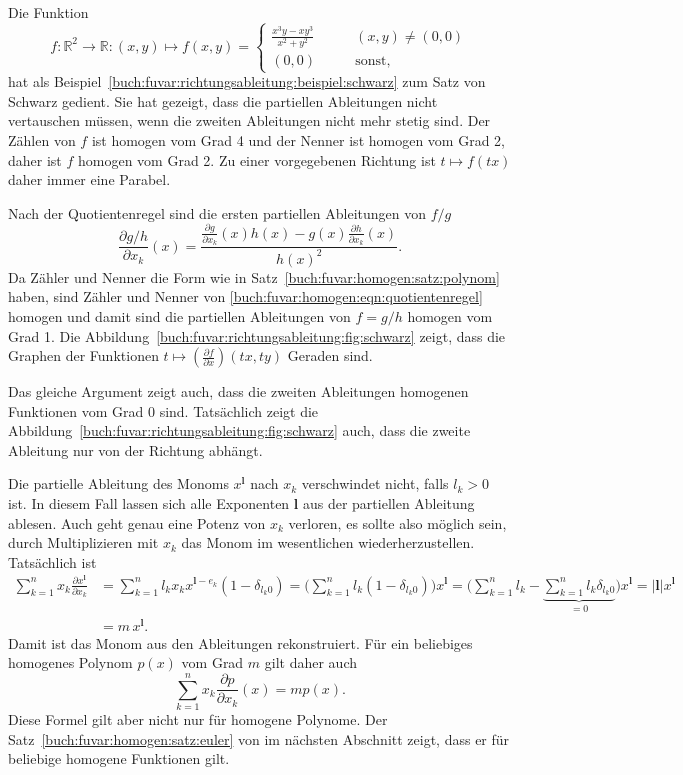 \begin{beispiel}
Die Funktion
\[
f
\colon
\mathbb{R}^2\to\mathbb{R}
:
(x,y)
\mapsto
f(x,y)
=
\begin{cases}
\displaystyle \frac{x^3y-xy^3}{x^2+y^2}&\qquad (x,y)\ne (0,0)\\
(0,0)&\qquad\text{sonst},
\end{cases}
\]
hat als Beispiel~\ref{buch:fuvar:richtungsableitung:beispiel:schwarz}
zum Satz von Schwarz gedient.
Sie hat gezeigt, dass die partiellen Ableitungen nicht vertauschen müssen,
wenn die zweiten Ableitungen nicht mehr stetig sind.
Der Zählen von $f$ ist homogen vom Grad 4 und der Nenner ist homogen vom
Grad 2, daher ist $f$ homogen vom Grad 2.
Zu einer vorgegebenen Richtung ist $t\mapsto f(tx)$ daher immer eine
Parabel.

Nach der Quotientenregel sind die ersten partiellen Ableitungen von $f/g$
\begin{equation}
\frac{\partial g/h}{\partial x_k}(x)
=
\frac{\displaystyle
\frac{\partial g}{\partial x_k}(x)h(x)-g(x)\frac{\partial h}{\partial x_k}(x)
}{h(x)^2}.
\label{buch:fuvar:homogen:eqn:quotientenregel}
\end{equation}
Da Zähler und Nenner die Form wie in Satz~\ref{buch:fuvar:homogen:satz:polynom}
haben, sind Zähler und Nenner von
\eqref{buch:fuvar:homogen:eqn:quotientenregel}
homogen und damit sind die partiellen Ableitungen von $f=g/h$ homogen
vom Grad 1.
Die Abbildung~\ref{buch:fuvar:richtungsableitung:fig:schwarz} zeigt,
dass die Graphen der Funktionen
$t\mapsto (\frac{\partial f}{\partial x})(tx,ty)$
Geraden sind.

Das gleiche Argument zeigt auch, dass die zweiten Ableitungen 
homogenen Funktionen vom Grad $0$ sind.
Tatsächlich zeigt 
die Abbildung~\ref{buch:fuvar:richtungsableitung:fig:schwarz} auch,
dass die zweite Ableitung nur von der Richtung abhängt.
\end{beispiel}

Die partielle Ableitung des Monoms $x^{\mathbf{l}}$ nach $x_k$
verschwindet nicht, falls $l_k>0$ ist.
In diesem Fall lassen sich alle Exponenten $\mathbf{l}$ aus der
partiellen Ableitung ablesen.
Auch geht genau eine Potenz von $x_k$ verloren, es sollte also
möglich sein, durch Multiplizieren mit $x_k$ das Monom im wesentlichen
wiederherzustellen.
Tatsächlich ist
\begin{align*}
\sum_{k=1}^n
x_k
\frac{\partial x^{\mathbf{l}}}{\partial x_k}
&=
\sum_{k=1}^n
l_k
x_k
x^{\mathbf{l}-e_k}
(1-\delta_{l_k0})
=
\biggl(
\sum_{k=1}^n
l_k
(1-\delta_{l_k0})
\biggr)
x^{\mathbf{l}}
=
\biggl(
\sum_{k=1}^n
l_k
-\underbrace{\sum_{k=1}^n
l_k\delta_{l_k0}}_{\displaystyle=0}
\biggr)
x^{\mathbf{l}}
=
|\mathbf{l}|
x^{\mathbf{l}}
\\
&=
m\,
x^{\mathbf{l}}.
\end{align*}
Damit ist das Monom aus den Ableitungen rekonstruiert.
Für ein beliebiges homogenes Polynom $p(x)$ vom Grad $m$ gilt daher auch
\[
\sum_{k=1}^n
x_k
\frac{\partial p}{\partial x_k}(x)
=
mp(x).
\]
Diese Formel gilt aber nicht nur für homogene Polynome.
Der Satz~\ref{buch:fuvar:homogen:satz:euler} von im nächsten Abschnitt
zeigt, dass er für beliebige homogene Funktionen gilt.

